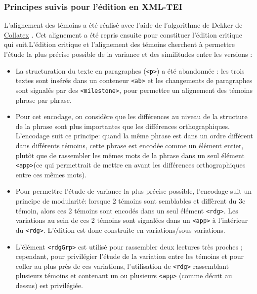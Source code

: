 \documentclass[12pt, a4paper]{article}
\begin{document}
	\subsubsection{Principes suivis pour l'édition en XML-TEI}
	L'alignement des témoins a été réalisé avec l'aide de l'algorithme de Dekker de  \href{https://collatex.net/}{Collatex} . Cet alignement a été repris ensuite pour constituer l'édition critique qui suit.L'édition critique et l'alignement des témoins cherchent à permettre l'étude la plus précise possible de la variance et des similitudes entre les versions : \begin{itemize} 
		\item{La structuration du texte en paragraphes (\texttt{<p>}) a été abandonnée : les trois textes sont insérés dans un conteneur \texttt{<ab>} 
			et les changements de paragraphes sont signalés par des \texttt{<milestone>}, pour permettre un alignement des témoins phrase par phrase.} 
		\item{Pour cet encodage, on considère que les différences au niveau de la structure de la phrase sont plus importantes que les différences orthographiques. L'encodage suit ce principe:
			quand la même phrase est dans un ordre différent dans différents témoins, cette phrase est encodée comme un élément entier, 
			plutôt que de rassembler les mêmes mots de la phrase dans un seul élément \texttt{<app>}(ce qui permettrait de mettre en avant les différences orthographiques entre ces mêmes mots).} 
		\item{Pour permettre l'étude de variance la plus précise possible, l'encodage suit un principe de modularité: lorsque 2 témoins sont semblables et diffèrent du 3e témoin, 
			alors ces 2 témoins sont encodés dans un seul élément \texttt{<rdg>}. Les variations au sein de ces 2 témoins sont signalées dans un \texttt{<app>} à l'intérieur du \texttt{<rdg>}.
			L'édition est donc construite en variations/sous-variations.} 
		\item{L'élément \texttt{<rdgGrp>} est utilisé pour rassembler deux lectures très proches ; cependant, pour privilégier l'étude de la variation entre les témoins
			et pour coller au plus près de ces variations, l'utilisation de \texttt{<rdg>} rassemblant plusieurs témoins et contenant un ou plusieurs \texttt{<app>} (comme décrit au dessus) est privilégiée.} 
	\end{itemize} 
\end{document}
